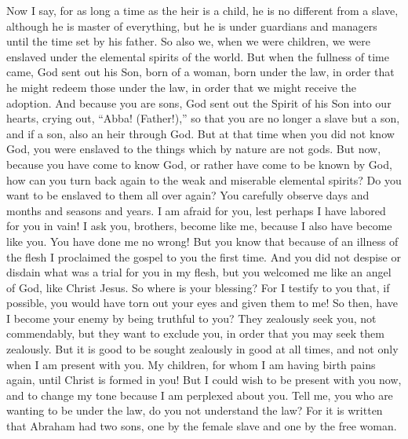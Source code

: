 \begin{biblechapter} %
 Now I say, for as long a time as the heir is a child, he is no different from a slave, although he is master of everything,
\verse but he is under guardians and managers until the time set by his father.
\verse So also we, when we were children, we were enslaved under the elemental spirits of the world.
\verse But when the fullness of time came, God sent out his Son, born of a woman, born under the law,
\verse in order that he might redeem those under the law, in order that we might receive the adoption.
\verse And because you are sons, God sent out the Spirit of his Son into our hearts, crying out, “Abba! (Father!),”
\verse so that you are no longer a slave but a son, and if a son, also an heir through God.
 But at that time when you did not know God, you were enslaved to the things which by nature are not gods.
\verse But now, because you have come to know God, or rather have come to be known by God, how can you turn back again to the weak and miserable elemental spirits? Do you want to be enslaved to them all over again?
\verse You carefully observe days and months and seasons and years.
\verse I am afraid for you, lest perhaps I have labored for you in vain!
\verse I ask you, brothers, become like me, because I also have become like you. You have done me no wrong!
 But you know that because of an illness of the flesh I proclaimed the gospel to you the first time.
\verse And you did not despise or disdain what was a trial for you in my flesh, but you welcomed me like an angel of God, like Christ Jesus.
\verse So where is your blessing? For I testify to you that, if possible, you would have torn out your eyes and given them to me!
\verse So then, have I become your enemy by being truthful to you?
\verse They zealously seek you, not commendably, but they want to exclude you, in order that you may seek them zealously.
\verse But it is good to be sought zealously in good at all times, and not only when I am present with you.
\verse My children, for whom I am having birth pains again, until Christ is formed in you!
\verse But I could wish to be present with you now, and to change my tone because I am perplexed about you.
 Tell me, you who are wanting to be under the law, do you not understand the law?
\verse For it is written that Abraham had two sons, one by the female slave and one by the free woman.

\end{biblechapter}
